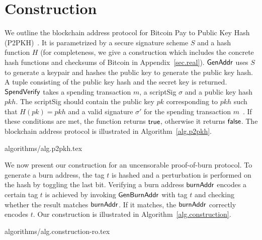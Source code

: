 \section{Construction}\label{section:construction}

We outline the blockchain address protocol for Bitcoin Pay to Public Key Hash (P2PKH)~\cite{bitcoin-dev-guide}. It is parametrized by a secure signature scheme $S$ and a hash function $H$ (for completeness, we give a construction which includes the concrete hash
functions and checksums of Bitcoin in Appendix~\ref{sec.real}).
$\mathsf{GenAddr}$ uses $S$ to generate a keypair and hashes the public key to generate the public key hash. A tuple consisting of the public key hash and the secret key is returned.
$\mathsf{SpendVerify}$ takes a spending transaction $m$, a scriptSig $\sigma$ and a public key hash $pkh$. The scriptSig should contain the public key $pk$ corresponding to $pkh$ such that $H(pk) = pkh$ and a valid signature $\sigma'$ for the spending transaction $m$~\cite{bitcoin-dev-guide}. If these conditions are met, the function returns $\mathsf{true}$, otherwise it returns $\mathsf{false}$.
The blockchain address protocol is illustrated in Algorithm~\ref{alg.p2pkh}.

{algorithms/alg.p2pkh.tex}

We now present our construction for an uncensorable proof-of-burn protocol. To generate a burn address, the tag $t$ is hashed and a perturbation is performed on the hash by toggling the last bit.
Verifying a burn address $\mathsf{burnAddr}$ encodes a certain tag $t$ is achieved by invoking $\mathsf{Gen}\-\mathsf{Burn}\-\mathsf{Addr}$ with tag $t$ and checking whether the result matches $\mathsf{burnAddr}$. If it matches, the $\mathsf{burnAddr}$ correctly encodes $t$. Our construction is illustrated in Algorithm~\ref{alg.construction}.

{algorithms/alg.construction-ro.tex}
